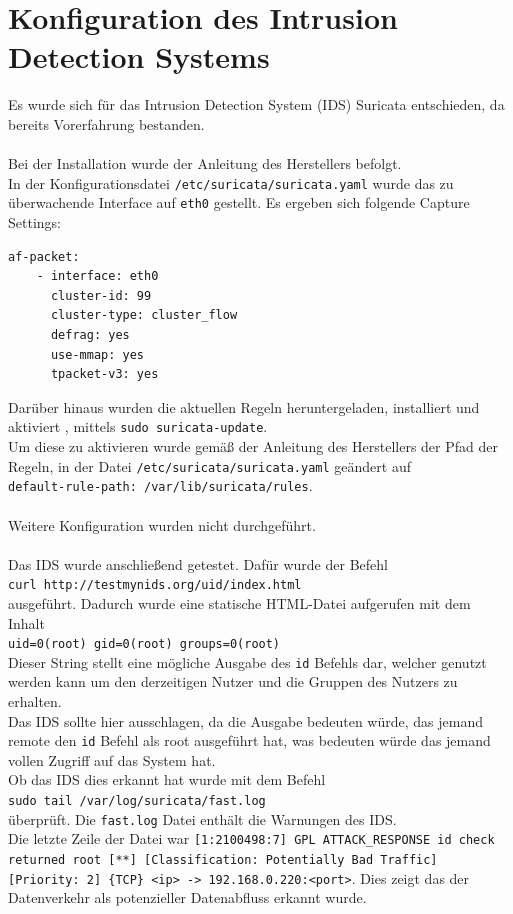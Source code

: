 \documentclass[
    a4paper,
    pagesize,
	pdftex,
    12pt,
]{scrartcl}
\begin{document}
\section{Konfiguration des Intrusion Detection Systems}\label{config-ids}
Es wurde sich für das Intrusion Detection System (IDS) Suricata entschieden, da bereits Vorerfahrung bestanden. \\ \\
Bei der Installation wurde der Anleitung des Herstellers \cite{suricata-quickstart} befolgt. \\
In der Konfigurationsdatei \lstinline[breaklines]|/etc/suricata/suricata.yaml| wurde das zu überwachende Interface auf \lstinline[breaklines]|eth0| gestellt. Es ergeben sich folgende Capture Settings:
\begin{lstlisting}[breaklines]
af-packet:
	- interface: eth0
	  cluster-id: 99
	  cluster-type: cluster_flow
	  defrag: yes
	  use-mmap: yes
	  tpacket-v3: yes
\end{lstlisting}
Darüber hinaus wurden die aktuellen Regeln heruntergeladen, installiert und aktiviert \cite{suricata-rulemanagement}, mittels \lstinline[breaklines]|sudo suricata-update|. \\
Um diese zu aktivieren wurde gemäß der Anleitung des Herstellers der Pfad der Regeln, in der Datei \lstinline[breaklines]|/etc/suricata/suricata.yaml| geändert auf \\ \lstinline[breaklines]|default-rule-path: /var/lib/suricata/rules|. \\ \\
Weitere Konfiguration wurden nicht durchgeführt. \\ \\
Das IDS wurde anschließend getestet. Dafür wurde der Befehl \\
\lstinline[breaklines]|curl http://testmynids.org/uid/index.html| \\
ausgeführt. Dadurch wurde eine statische HTML-Datei aufgerufen mit dem Inhalt \\
\lstinline[breaklines]|uid=0(root) gid=0(root) groups=0(root)| \\
Dieser String stellt eine mögliche Ausgabe des \lstinline[breaklines]|id| Befehls dar, welcher genutzt werden kann um den derzeitigen Nutzer und die Gruppen des Nutzers zu erhalten. \\
Das IDS sollte hier ausschlagen, da die Ausgabe bedeuten würde, das jemand remote den \lstinline[breaklines]|id| Befehl als root ausgeführt hat, was bedeuten würde das jemand vollen Zugriff auf das System hat. \\
Ob das IDS dies erkannt hat wurde mit dem Befehl \\
\lstinline[breaklines]|sudo tail /var/log/suricata/fast.log| \\ 
überprüft. Die \lstinline[breaklines]|fast.log| Datei enthält die Warnungen des IDS. \\
Die letzte Zeile der Datei war \lstinline[breaklines]|[1:2100498:7] GPL ATTACK_RESPONSE id check returned root [**] [Classification: Potentially Bad Traffic] [Priority: 2] {TCP} <ip> -> 192.168.0.220:<port>|. Dies zeigt das der Datenverkehr als potenzieller Datenabfluss erkannt wurde.
\end{document}
